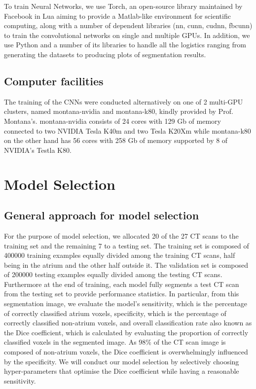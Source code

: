 \noindent To train Neural Networks, we use Torch, an open-source library maintained by Facebook in Lua aiming to provide a Matlab-like environment for scientific computing, along with a number of dependent libraries (nn, cunn, cudnn, fbcunn) to train the convolutional networks on single and multiple GPUs. In addition, we use Python and a number of its libraries to handle all the logistics ranging from generating the datasets to producing plots of segmentation results.

\subsection{Computer facilities}

\noindent The training of the CNNs were conducted alternatively on one of 2 multi-GPU clusters, named montana-nvidia and montana-k80, kindly provided by Prof. Montana's. montana-nvidia consists of 24 cores with 129 Gb of memory connected to two NVIDIA Tesla K40m and two Tesla K20Xm while montana-k80 on the other hand has 56 cores with 258 Gb of memory supported by 8 of NVIDIA's Testla K80. 

\section{Model Selection}

\subsection{General approach for model selection}

\noindent For the purpose of model selection, we allocated 20 of the 27 CT scans to the training set and the remaining 7 to a testing set. The training set is composed of 400000 training examples equally divided among the training CT scans, half being in the atrium and the other half outside it. The validation set is composed of 200000 testing examples equally divided among the testing CT scans. Furthermore at the end of training, each model fully segments a test CT scan from the testing set to provide performance statistics. In particular, from this segmentation image, we evaluate the model's sensitivity, which is the percentage of correctly classified atrium voxels, specificity, which is the percentage of correctly classified non-atrium voxels, and overall classification rate also known as the Dice coefficient, which is calculated by evaluating the proportion of correctly classified voxels in the segmented image. As 98\% of the CT scan image is composed of non-atrium voxels, the Dice coefficient is overwhelmingly influenced by the specificity. We will conduct our model selection by selectively choosing hyper-parameters that optimise the Dice coefficient while having a reasonable sensitivity.\\

